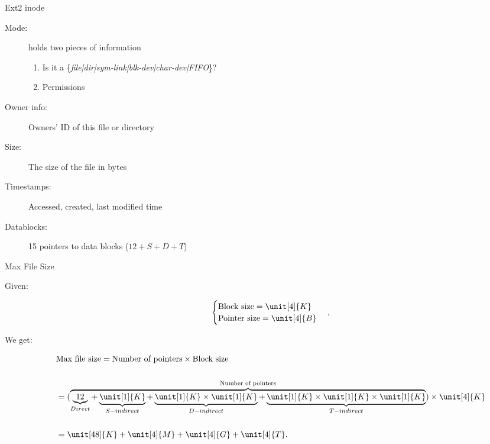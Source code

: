 \begin{frame}
  \begin{block}{Ext2 inode}
    \begin{description}
    \item[Mode:] holds two pieces of information
      \begin{enumerate}
      \item Is it a \mbox{\{\emph{file|dir|sym-link|blk-dev|char-dev|FIFO}\}}?
      \item Permissions
      \end{enumerate}
    \item[Owner info:] Owners' ID of this file or directory
    \item[Size:] The size of the file in bytes
    \item[Timestamps:] Accessed, created, last modified time
    \item[Datablocks:] 15 pointers to data blocks ($12+S+D+T$)
    \end{description}
  \end{block}
\end{frame}

\begin{frame}
  \begin{block}{Max File Size}
    \begin{description}
    \item[Given:]
      \begin{equation*}
        \begin{cases}
          \text{Block size}=\unit[4]{K}\\
          \text{Pointer size}=\unit[4]{B}
        \end{cases},
      \end{equation*}    
    \item[We get:]
      \begin{equation*}
        \begin{split}
          &\text{Max file size}
          = \text{Number of pointers}\times\text{Block size}\\
          &\\
          &= (\overbrace{%
            \underbrace{12}_{Direct} + \underbrace{\unit[1]{K}}_{S-indirect} + %
            \underbrace{\unit[1]{K}\times\unit[1]{K}}_{D-indirect} + %
            \underbrace{\unit[1]{K}\times\unit[1]{K}\times\unit[1]{K}}_{T-indirect}
          }^{\text{Number of pointers}})\times\unit[4]{K}\\
          &\\
          &= \unit[48]{K} + \unit[4]{M} + \unit[4]{G} + \unit[4]{T}.
        \end{split}
      \end{equation*}
    \end{description}
  \end{block}
\end{frame}

